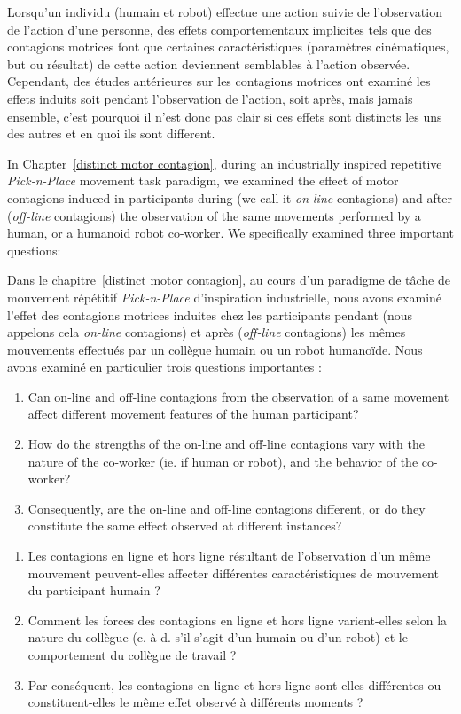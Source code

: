 Lorsqu'un individu (humain et robot) effectue une action suivie de l'observation de l'action d'une personne, des effets comportementaux implicites tels que des contagions motrices font que certaines caractéristiques (paramètres cinématiques, but ou résultat) de cette action deviennent semblables à l'action observée. Cependant, des études antérieures sur les contagions motrices ont examiné les effets induits soit pendant l'observation de l'action, soit après, mais jamais ensemble, c'est pourquoi il n'est donc pas clair si ces effets sont distincts les uns des autres et en quoi ils sont different.


In Chapter~\ref{distinct motor contagion}, during an industrially inspired repetitive \textit{Pick-n-Place} movement task paradigm, we examined the effect of motor contagions induced in participants during (we call it \textit{on-line} contagions) and after (\textit{off-line} contagions) the observation of the same movements performed by a human, or a humanoid robot co-worker. We specifically examined three important questions:

Dans le chapitre~\ref{distinct motor contagion}, au cours d'un paradigme de tâche de mouvement répétitif \textit{Pick-n-Place} d'inspiration industrielle, nous avons examiné l'effet des contagions motrices induites chez les participants pendant (nous appelons cela \textit{on-line} contagions) et après (\textit{off-line} contagions) les mêmes mouvements effectués par un collègue humain ou un robot humanoïde. Nous avons examiné en particulier trois questions importantes :



\begin{enumerate}
	\item Can on-line and off-line contagions from the observation of a same movement affect different movement features of the human participant?
	\item How do the strengths of the on-line and off-line contagions vary with the nature of the co-worker (ie. if human or robot), and the behavior of the co-worker?
	\item Consequently, are the on-line and off-line contagions different, or do they constitute the same effect observed at different instances?
\end{enumerate}

\begin{enumerate}
	\item Les contagions en ligne et hors ligne résultant de l'observation d'un même mouvement peuvent-elles affecter différentes caractéristiques de mouvement du participant humain ?
	\item Comment les forces des contagions en ligne et hors ligne varient-elles selon la nature du collègue (c.-à-d. s'il s'agit d'un humain ou d'un robot) et le comportement du collègue de travail ?
	\item Par conséquent, les contagions en ligne et hors ligne sont-elles différentes ou constituent-elles le même effet observé à différents moments ?
\end{enumerate}



